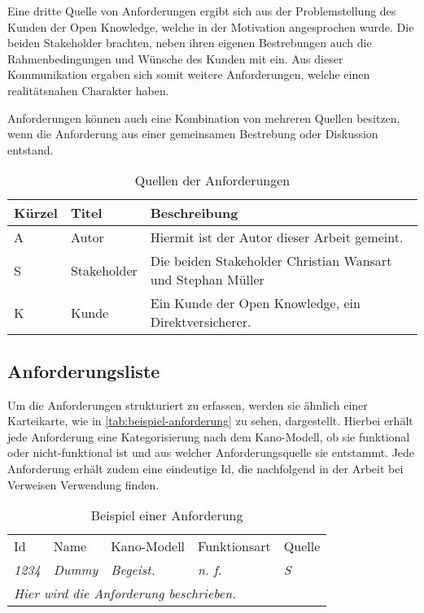 Eine dritte Quelle von Anforderungen ergibt sich aus der Problemstellung des Kunden der Open Knowledge, welche in der Motivation angesprochen wurde. Die beiden Stakeholder brachten, neben ihren eigenen Bestrebungen auch die Rahmenbedingungen und Wünsche des Kunden mit ein. Aus dieser Kommunikation ergaben sich somit weitere Anforderungen, welche einen realitätsnahen Charakter haben.

Anforderungen können auch eine Kombination von mehreren Quellen besitzen, wenn die Anforderung aus einer gemeinsamen Bestrebung oder Diskussion entstand.

\begin{table}[H]
\begin{tabular}{ |p{1.15cm}|p{1.9cm}|p{10.45cm}| }
	\hline
	Kürzel & Titel       & Beschreibung \\
	\hline
	A      & Autor       & Hiermit ist der Autor dieser Arbeit gemeint. \\
	\hline
	S      & Stakeholder & Die beiden Stakeholder Christian Wansart und Stephan Müller \\
	\hline
	K      & Kunde       & Ein Kunde der Open Knowledge, ein Direktversicherer. \\
	\hline
\end{tabular}
 \captionsetup{justification=centering}
  \caption{Quellen der Anforderungen}
   \label{tab:quellen-der-anforderungen}
\end{table}
	
\subsection{Anforderungsliste}

Um die Anforderungen strukturiert zu erfassen, werden sie ähnlich einer Karteikarte, wie in \autoref{tab:beispiel-anforderung} zu sehen, dargestellt. Hierbei erhält jede Anforderung eine Kategorisierung nach dem Kano-Modell, ob sie funktional oder nicht-funktional ist und aus welcher Anforderungsquelle sie entstammt. Jede Anforderung erhält zudem eine eindeutige Id, die nachfolgend in der Arbeit bei Verweisen Verwendung finden.

\begin{table}[H]
\begin{tabular}{ |p{1.25cm}|p{5.5cm}|p{2.25cm}|p{2.1cm}|p{1.25cm}| }
\hline
Id            & Name          & Kano-Modell   & Funktionsart  & Quelle        \\
\textit{1234} & \textit{Dummy} & \textit{Begeist.} & \textit{n. f.} & \textit{S} \\
\hline
\multicolumn{5}{|l|}{\textit{Hier wird die Anforderung beschrieben.}} \\
\hline
\end{tabular}
 \captionsetup{justification=centering}
  \caption{Beispiel einer Anforderung}
   \label{tab:beispiel-anforderung}
\end{table}




